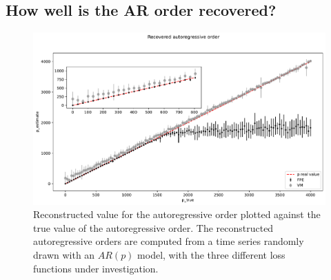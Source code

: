 \documentclass{aa}
\begin{document}
\subsection{How well is the AR order recovered?}\label{sec:arp_validation}

\begin{figure}
	\centering
	\includegraphics[width = \linewidth]{Images/Plots/ar_order}
	\caption{Reconstructed value for the autoregressive order plotted against the true value of the autoregressive order.
	The reconstructed autoregressive orders are computed from a time series randomly drawn with an $AR(p)$ model, with the three different loss functions under investigation.
	}
	\label{fig:p_vs_ptrue}
\end{figure}
\end{document}
